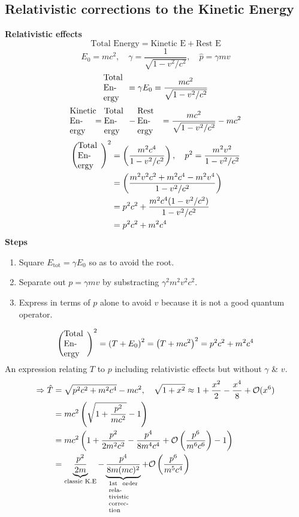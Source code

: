 \documentclass[12pt,fancychapters]{report}
\numberwithin{equation}{section}
\begin{document}
\subsection{Relativistic corrections to the Kinetic Energy}
\textbf{Relativistic effects}
\[
  \text{Total Energy} = \text{Kinetic E} + \text{Rest E}
\]
\[E_0 = mc^2, \quad \gamma = \frac{1}{\sqrt{1 - v^2/c^2}}, \quad \hat{p} = \gamma mv\]
\[
  \parbox{0.08\textwidth}{Total Energy} = \gamma E_0 = \frac{mc^2}{\sqrt{1-v^2/c^2}}
\]
\[
  \parbox{0.08\textwidth}{Kinetic Energy} = \parbox{0.08\textwidth}{Total Energy} - 
  \parbox{0.08\textwidth}{Rest Energy} = \frac{mc^2}{\sqrt{1 -v^2/c^2}} - mc^2
\]
\begin{align*}
  \left(\parbox{0.08\textwidth}{Total Energy}\right)^2 &= \left(\frac{m^2c^4}{1-v^2/c^2}\right), 
  \quad p^2 = \frac{m^2v^2}{1-v^2/c^2}\\
  &= \left(\frac{m^2v^2c^2 + m^2 c^4 - m^2 v^4}{1-v^2/c^2}\right)\\
  &= p^2 c^2 + \frac{m^2 c^4 (1-v^2/c^2)}{1-v^2/c^2}\\
  &= p^2 c^2 + m^2 c^4
\end{align*}
\textbf{Steps}
\begin{enumerate}
  \item Square $E_\text{tot} = \gamma E_0$ so as to avoid the root.
  \item Separate out $p=\gamma m v$ by substracting $\gamma^2 m^2 v^2 c^2$.
  \item Express in terms of $p$ alone to avoid $v$ because it is not a good quantum operator.
\end{enumerate}
\[
 \left(\parbox{0.08\textwidth}{Total Energy}\right)^2 = \left(T + E_0 \right)^2 = 
 \left(T + mc^2\right)^2 = p^2 c^2 + m^2 c^4
\]
An expression relating $T$ to $p$ including relativistic effects but without $\gamma$ \& $v$.
\begin{align*}
  \Rightarrow \hat{T} &= \sqrt{p^2c^2 + m^2c^4} - mc^2, \quad \sqrt{1+x^2} \approx 
  1 + \frac{x^2}{2}-\frac{x^4}{8} + \mathcal{O}(x^6)\\
  &= mc^2 \left(\sqrt{1 +\frac{p^2}{mc^2}} - 1\right)\\
  &= mc^2 \left(1+\frac{p^2}{2m^2c^2} - \frac{p^4}{8m^4c^4} + \mathcal{O}\left(\frac{p^6}
  {m^6c^6}\right) - 1\right)\\
  &= \underbrace{\frac{p^2}{2m}}_\text{classic K.E} - 
  \underbrace{\frac{p^4}{8m(mc)^2}}_{\scriptsize \parbox{0.1\textwidth}{1st order relativistic correction}}
  + \mathcal{O}\left(\frac{p^6}{m^5c^4}\right)
\end{align*}
\end{document}
